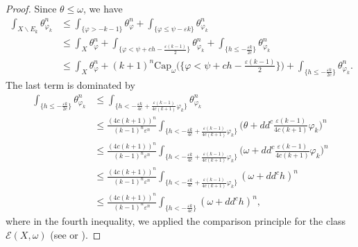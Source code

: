 \documentclass[a4paper]{amsart}
\numberwithin{equation}{section}
\theoremstyle{definition}
\newcommand{\ddc}{dd^c}
\numberwithin{equation}{section}
\newcommand{\capK}{\text{Cap}}
\begin{document}
\begin{proof}
Since $\theta\leq \omega$, we have
\begin{equation*}\label{eq: eq1}
\begin{split}
\int_{ X\backslash E_k } \theta_{ \varphi_k }^n&\leq\int_{ \big\{\varphi > - k - 1 \big\} }  \theta_{ \varphi } ^n + \int_{ \big\{ \varphi \leq \psi - \varepsilon k \big\} } \theta_{ \varphi_k }^n\\
&\leq \int_{X}\theta_{ \varphi }^n  + \int_{ \{ \varphi < \psi + ch - \frac { \varepsilon ( k - 1 ) } { 2 } \} } \theta_{ \varphi_k }^n + \int_{ \big\{ h \leq - \frac { \varepsilon k } { 2c } \big\} } \theta_{ \varphi_k }^n\\
&\leq \int_{ X }  \theta_{ \varphi }^n  +  ( k + 1 )^n \capK_{ \omega } \bigg( \bigg\{ \varphi < \psi + ch - \frac { \varepsilon ( k - 1 ) } { 2 } \bigg\} \bigg) + \int_{ \{ h \leq - \frac { \varepsilon k } { 2c } \} }  \theta_{ \varphi_k }^n.
	\end{split}
\end{equation*}
The last term is dominated by
\begin{equation*}\label{eq: eq2}
\begin{split}
\int_{ \big\{ h\leq - \frac {\varepsilon k } { 2c } \big\} } \theta_{ \varphi_k }^n & \leq \int_{ \big\{ h < - \frac { \varepsilon k } { 4c } + \frac { \varepsilon ( k - 1 ) } { 4c ( k + 1 ) } \varphi_k \big\} } \theta_{ \varphi_k }^n\\
  &\leq \frac { (4c ( k + 1 ) )^n } {  (k - 1 )^n \varepsilon^n } \int_{ \big\{ h < - \frac { \varepsilon k } { 4c } + \frac { \varepsilon ( k - 1 ) } { 4c ( k + 1 ) } \varphi_k\big \} } \bigg( \theta+\ddc {  \frac { \varepsilon ( k - 1 ) } { 4c ( k + 1 ) } \varphi_k }  \bigg)^n\\
&\leq \frac { ( 4c ( k + 1 ) )^n } { ( k - 1 )^n \varepsilon^n } \int_{ \big\{ h < - \frac { \varepsilon k } { 4c } + \frac { \varepsilon ( k - 1 ) } { 4c ( k + 1 ) } \varphi_k \big\} } \bigg( \omega+\ddc {  \frac { \varepsilon ( k - 1 ) } { 4c ( k + 1 ) } \varphi_k }  \bigg)^n\\
&\leq \frac { ( 4c ( k + 1 ) )^n } { ( k - 1 )^n \varepsilon^n } \int_{ \big \{ h < - \frac { \varepsilon k } { 4c } + \frac { \varepsilon ( k - 1 ) } { 4c ( k + 1 ) } \varphi_k \big\} } (\omega + dd^ch )^n\\
&\leq \frac { ( 4c ( k + 1 ) )^n } { ( k - 1 )^n \varepsilon^n } \int_{ \big\{ h < - \frac { \varepsilon k } { 4c } \big\} } (\omega + dd^ch )^n,
\end{split}
\end{equation*} where in the fourth inequality, we applied the comparison principle for the class $\mathcal E(X, \omega)$ (see \cite[Theorem 1.5]{guedj2007weighted} or \cite[Theorem 2.3]{dinew2009uniqueness}).

\end{proof}
\end{document}
